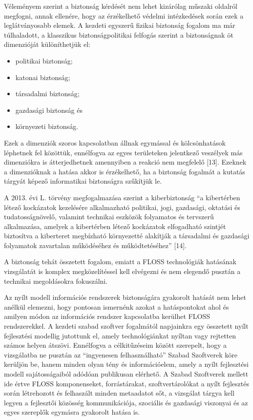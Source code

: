 \documentclass[12pt,magyar,a4paper,oneside]{scrreprt}
\providecommand{\tightlist}{%
  \setlength{\itemsep}{0pt}\setlength{\parskip}{0pt}}
\begin{document}
Véleményem szerint a biztonság kérdését nem lehet kizárólag műszaki
oldalról megfogni, annak ellenére, hogy az érzékelhető védelmi
intézkedések során ezek a leglátványosabb elemek. A kezdeti egyszerű
fizikai biztonság fogalom ma már túlhaladott, a klasszikus
biztonságpolitikai felfogás szerint a biztonságnak öt dimenzióját
különíthetjük el:

\begin{itemize}
\tightlist
\item
  politikai biztonság;
\item
  katonai biztonság;
\item
  társadalmi biztonság;
\item
  gazdasági biztonság és
\item
  környezeti biztonság.
\end{itemize}

Ezek a dimenziók szoros kapcsolatban állnak egymással és kölcsönhatások
léphetnek fel közöttük, ennélfogva az egyes területeken jelentkező
veszélyek más dimenziókra is átterjedhetnek amennyiben a reakció nem
megfelelő {[}13{]}. Ezeknek a dimenzióknak a hatása akkor is
érzékelhető, ha a biztonság fogalmát a kutatás tárgyát képező
informatikai biztonságra szűkítjük le.

A 2013. évi L. törvény megfogalmazása szerint a kiberbiztonság ``a
kibertérben létező kockázatok kezelésére alkalmazható politikai, jogi,
gazdasági, oktatási és tudatosságnövelő, valamint technikai eszközök
folyamatos és tervszerű alkalmazása, amelyek a kibertérben létező
kockázatok elfogadható szintjét biztosítva a kiberteret megbízható
környezetté alakítják a társadalmi és gazdasági folyamatok zavartalan
működéséhez és működtetéséhez'' {[}14{]}.

A biztonság tehát összetett fogalom, emiatt a FLOSS technológiák
hatásának vizsgálatát is komplex megközelítéssel kell elvégezni és nem
elegendő pusztán a technikai megoldásokra fokuszálni.

Az nyílt modell információs rendszerek biztonságára gyakorolt hatását
nem lehet anélkül elemezni, hogy pontosan ismernénk azokat a
hatáspontokat ahol és amilyen módon az információs rendszer kapcsolatba
kerülhet FLOSS rendszerekkel. A kezdeti szabad szoftver fogalmától
napjainkra egy összetett nyílt fejlesztési modellig jutottunk el, amely
technológiánkat nyíltan vagy rejtetten számos helyen átszövi. Ennélfogva
a célkitűzéseim között szerepelt, hogy a vizsgálatba ne pusztán az
``ingyenesen felhasználható'' Szabad Szoftverek köre kerüljön be, hanem
minden olyan tény és információelem, amely a nyílt fejlesztési modell
sajátosságaiból adódóan publikusan elérhető. A Szabad Szoftverek mellett
ide értve FLOSS komponenseket, forrástárakat, szoftvertárolókat a nyílt
fejlesztés során létrehozott és felhaszált minden metaadatot sőt, a
vizsgálat tárgya kell legyen a fejlesztői közösség kommunikációja,
szociális és gazdasági viszonyai és az egyes szereplők egymásra
gyakorolt hatása is.
\end{document}
